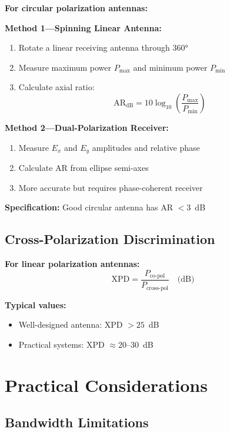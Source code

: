 \textbf{For circular polarization antennas:}

\textbf{Method 1---Spinning Linear Antenna:}
\begin{enumerate}
\item Rotate a linear receiving antenna through $360°$
\item Measure maximum power $P_{\text{max}}$ and minimum power $P_{\text{min}}$
\item Calculate axial ratio:
\begin{equation}
\mathrm{AR}_{\text{dB}} = 10\log_{10}\left(\frac{P_{\text{max}}}{P_{\text{min}}}\right)
\label{eq:ar-measurement}
\end{equation}
\end{enumerate}

\textbf{Method 2---Dual-Polarization Receiver:}
\begin{enumerate}
\item Measure $E_x$ and $E_y$ amplitudes and relative phase
\item Calculate AR from ellipse semi-axes
\item More accurate but requires phase-coherent receiver
\end{enumerate}

\textbf{Specification:} Good circular antenna has AR $< 3$~dB

\subsection{Cross-Polarization Discrimination}

\textbf{For linear polarization antennas:}
\begin{equation}
\mathrm{XPD} = \frac{P_{\text{co-pol}}}{P_{\text{cross-pol}}} \quad \text{(dB)}
\end{equation}

\textbf{Typical values:}
\begin{itemize}
\item Well-designed antenna: XPD $> 25$~dB
\item Practical systems: XPD $\approx 20$--30~dB
\end{itemize}

\section{Practical Considerations}

\subsection{Bandwidth Limitations}

